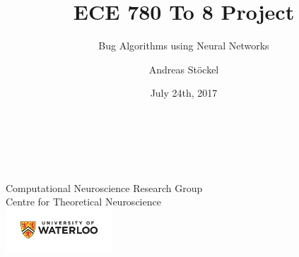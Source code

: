 \documentclass[aspectratio=169]{beamer}
\title{ECE 780 To 8 Project}
\subtitle{Bug Algorithms using Neural Networks}
\author{Andreas Stöckel}
\date{July 24th, 2017}
\begin{document}
\begin{frame}
	\centering
	{\Large\color{violet}{\inserttitle}\\}
	{\large\color{violet}{\insertsubtitle}\\[0.5cm]}
	{\large{\insertauthor}\\[0.25cm]}
	Computational Neuroscience Research Group\\
	Centre for Theoretical Neuroscience\\[0.25cm]
	\includegraphics[width=0.3\textwidth]{media/uwlogo.pdf}\\[0.25cm]
	\insertdate
\end{frame}

\end{document}
